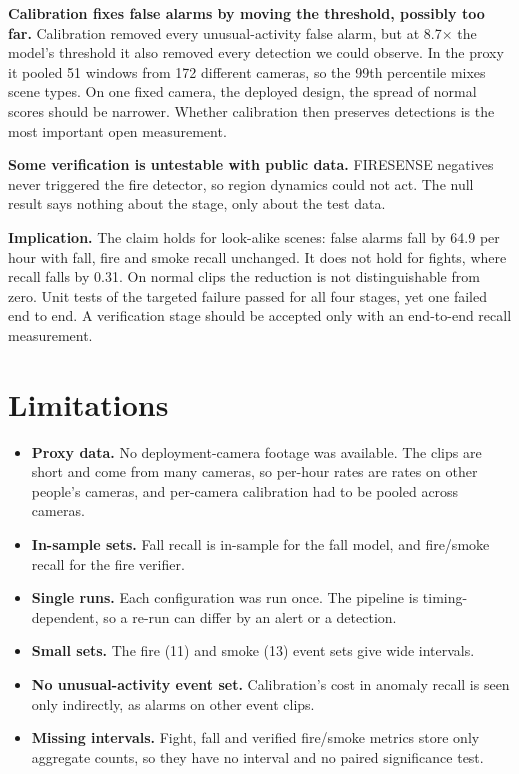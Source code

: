 \documentclass[conference]{IEEEtran}
\begin{document}
\textbf{Calibration fixes false alarms by moving the threshold, possibly too far.} Calibration removed every unusual-activity false alarm, but at 8.7$\times$ the model's threshold it also removed every detection we could observe. In the proxy it pooled 51 windows from 172 different cameras, so the 99th percentile mixes scene types. On one fixed camera, the deployed design, the spread of normal scores should be narrower. Whether calibration then preserves detections is the most important open measurement.

\textbf{Some verification is untestable with public data.} FIRESENSE negatives never triggered the fire detector, so region dynamics could not act. The null result says nothing about the stage, only about the test data.

\textbf{Implication.} The claim holds for look-alike scenes: false alarms fall by 64.9 per hour with fall, fire and smoke recall unchanged. It does not hold for fights, where recall falls by 0.31. On normal clips the reduction is not distinguishable from zero. Unit tests of the targeted failure passed for all four stages, yet one failed end to end. A verification stage should be accepted only with an end-to-end recall measurement.

\section{Limitations}
\begin{itemize}
\item \textbf{Proxy data.} No deployment-camera footage was available. The clips are short and come from many cameras, so per-hour rates are rates on other people's cameras, and per-camera calibration had to be pooled across cameras.
\item \textbf{In-sample sets.} Fall recall is in-sample for the fall model, and fire/smoke recall for the fire verifier.
\item \textbf{Single runs.} Each configuration was run once. The pipeline is timing-dependent, so a re-run can differ by an alert or a detection.
\item \textbf{Small sets.} The fire (11) and smoke (13) event sets give wide intervals.
\item \textbf{No unusual-activity event set.} Calibration's cost in anomaly recall is seen only indirectly, as alarms on other event clips.
\item \textbf{Missing intervals.} Fight, fall and verified fire/smoke metrics store only aggregate counts, so they have no interval and no paired significance test.
\end{itemize}
\end{document}
